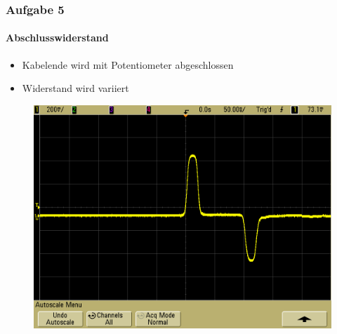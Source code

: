 \begin{frame}
    \frametitle{Aufgabe 5}
    \framesubtitle{Abschlusswiderstand}
    \begin{itemize}
        \item Kabelende wird mit Potentiometer abgeschlossen
        \item Widerstand wird variiert
    \end{itemize}
    \begin{figure}[H]
    \begin{center}
            \includegraphics[scale=0.2]{./img/5b_Potentiometer_1.png}
    \end{center}
    \end{figure}
\end{frame}
